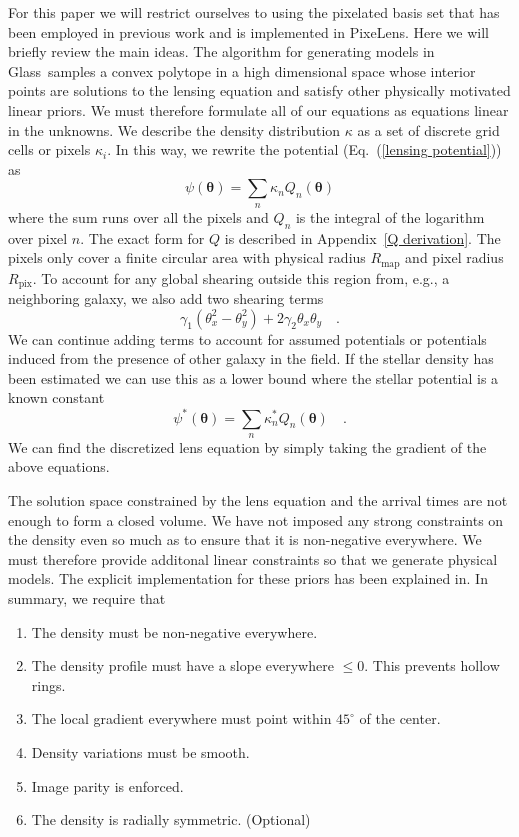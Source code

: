\documentclass[onecolumn,galley]{mn2e}
\newcommand{\Glass}{{\sc Glass}}
\newcommand{\PixeLens}{{\sc PixeLens}}
\newcommand{\Rmap}{\ensuremath{R_\mathrm{map}}}
\newcommand{\Rpix}{\ensuremath{R_\mathrm{pix}}}
\newcommand{\eqnref}[1] {Eq.~(\ref{#1})}
\newcommand{\appref}[1] {Appendix~\ref{#1}}
\renewcommand{\vec}[1]{\ensuremath{\boldsymbol{#1}}}
\begin{document}
For this paper we will restrict ourselves to using the pixelated basis set that
has been employed in previous work and is implemented in \PixeLens. Here we will
briefly review the main ideas. The algorithm for generating models in \Glass\
samples a convex polytope in a high dimensional space whose interior points are
solutions to the lensing equation and satisfy other physically motivated linear
priors. We must therefore formulate all of our equations as equations linear in the
unknowns. We describe the density distribution
$\kappa$ as a set of discrete grid cells or pixels $\kappa_i$.
In this way, we rewrite the potential (\eqnref{lensing potential}) as
%
\begin{equation}
  \psi(\vec\theta) = \sum_n \kappa_n Q_n(\vec\theta)
\end{equation}
%
where the sum runs over all the pixels and $Q_n$ is the integral of the logarithm
over pixel $n$. The exact form for $Q$ is described in \appref{Q derivation}.
The pixels only cover a finite circular area with physical radius $\Rmap$ and 
pixel radius $\Rpix$. To account for any global shearing outside this region
from, e.g., a neighboring galaxy, we also add two shearing terms
%
\begin{equation}
\gamma_1(\theta_x^2 - \theta_y^2) + 2\gamma_2\theta_x\theta_y\quad.
\end{equation}
%
We can continue adding terms to account for assumed potentials or potentials
induced from the presence of other galaxy in the field. If the stellar density
has been estimated we can use this as a lower bound where the stellar potential
is a known constant
%
\begin{equation}
  \psi^*(\vec\theta) = \sum_n \kappa^*_n Q_n(\vec\theta)\quad.
\end{equation}
%
We can find the discretized lens equation by simply taking the gradient of the
above equations. 

The solution space constrained by the lens equation and the arrival times are
not enough to form a closed volume. We have not imposed any strong constraints
on the density even so much as to ensure that it is non-negative everywhere. We
must therefore provide additonal linear constraints so that we generate physical
models. The explicit implementation for these priors has been explained in. In
summary, we require that
\begin{enumerate}
\item The density must be non-negative everywhere.
\item The density profile must have a slope everywhere $\le 0$. This prevents hollow rings.
\item The local gradient everywhere must point within $45^{\circ}$ of the center.
\item Density variations must be smooth.
\item Image parity is enforced.
\item The density is radially symmetric. (Optional)
\end{enumerate}
\end{document}
